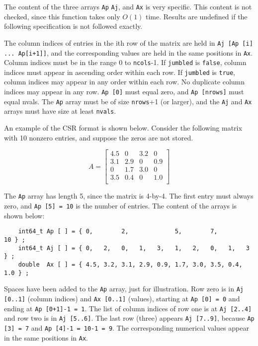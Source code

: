 The content of the three arrays \verb'Ap' \verb'Aj', and \verb'Ax' is very
specific.  This content is not checked, since this function takes only
$O(1)$ time.  Results are undefined if the following specification is not
followed exactly.

The column indices of entries in the ith row of the matrix are held in
\verb'Aj [Ap [i] ... Ap[i+1]]', and the corresponding values are held in the
same positions in \verb'Ax'.  Column indices must be in the range 0 to
\verb'ncols'-1.  If \verb'jumbled' is \verb'false', column indices must appear
in ascending order within each row.  If \verb'jumbled' is \verb'true', column
indices may appear in any order within each row.  No duplicate column indices
may appear in any row.  \verb'Ap [0]' must equal zero, and \verb'Ap [nrows]'
must equal nvals.  The \verb'Ap' array must be of size \verb'nrows'+1 (or
larger), and the \verb'Aj' and \verb'Ax' arrays must have size at least
\verb'nvals'.

An example of the CSR format is shown below.  Consider the following
matrix with 10 nonzero entries, and suppose the zeros are not stored.

    \begin{equation}
    \label{eqn:Aexample}
    A = \left[
    \begin{array}{cccc}
    4.5 &   0 & 3.2 &   0 \\
    3.1 & 2.9 &  0  & 0.9 \\
     0  & 1.7 & 3.0 &   0 \\
    3.5 & 0.4 &  0  & 1.0 \\
    \end{array}
    \right]
    \end{equation}

The \verb'Ap' array has length 5, since the matrix is 4-by-4.  The first entry
must always zero, and \verb'Ap [5] = 10' is the number of entries.
The content of the arrays is shown below:

{\footnotesize
\begin{verbatim}
    int64_t Ap [ ] = { 0,        2,             5,        7,            10 } ;
    int64_t Aj [ ] = { 0,   2,   0,   1,   3,   1,   2,   0,   1,   3   } ;
    double  Ax [ ] = { 4.5, 3.2, 3.1, 2.9, 0.9, 1.7, 3.0, 3.5, 0.4, 1.0 } ; \end{verbatim} }

Spaces have been added to the \verb'Ap' array, just for illustration.  Row zero
is in \verb'Aj [0..1]' (column indices) and \verb'Ax [0..1]' (values), starting
at \verb'Ap [0] = 0' and ending at \verb'Ap [0+1]-1 = 1'.  The list of column
indices of row one is at \verb'Aj [2..4]' and row two is in \verb'Aj [5..6]'.
The last row (three) appears \verb'Aj [7..9]', because \verb'Ap [3] = 7' and
\verb'Ap [4]-1 = 10-1 = 9'.  The corresponding numerical values appear in the
same positions in \verb'Ax'.


